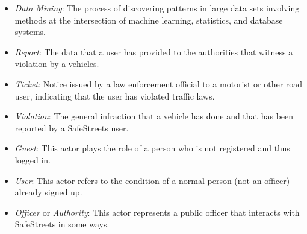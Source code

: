 \begin{itemize}
	\item \textit{Data Mining}: The process of discovering patterns in large data sets involving methods at the intersection of machine learning, statistics, and database systems.
	\item \textit{Report}: The data that a user has provided to the authorities that witness a violation by a vehicles.
	\item \textit{Ticket}: Notice issued by a law enforcement official to a motorist or other road user, indicating that the user has violated traffic laws.
	\item \textit{Violation}: The general infraction that a vehicle has done and that has been reported by a SafeStreets user.
	\item \textit{Guest}: This actor plays the role of a person who is not registered and thus logged in.
	\item \textit{User}: This actor refers to the condition of a normal person (not an officer) already signed up.
	\item \textit{Officer} or \textit{Authority}: This actor represents a public officer that interacts with SafeStreets in some ways.
\end{itemize}